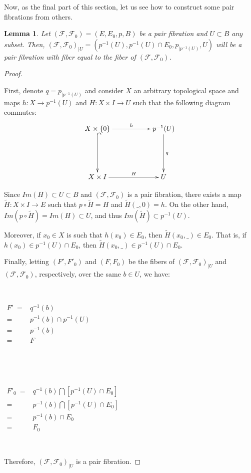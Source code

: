 \documentclass[12pt,oneside]{book}
\newtheorem{lem}    {Lemma}[chapter]
\newcommand{\wt}{\widetilde}
\begin{document}
    Now, as the final part of this section, let us see how to construct some pair fibrations from others.
    
    \begin{lem}\label{pf_restricao}
        Let $(\mathcal{F},\mathcal{F}_{0})=(E,E_{0},p,B)$ be a pair fibration and $U\subset B$ any subset. Then, 
        $(\mathcal{F},\mathcal{F}_{0})_{|U}=(p^{-1}(U),p^{-1}(U)\cap E_{0},p_{|p^{-1}(U)},U)$ will be a pair 
        fibration with fiber equal to the fiber of $(\mathcal{F},\mathcal{F}_{0})$.
    \end{lem}
    \begin{proof}
    
    \
    
    First, denote $q=p_{|p^{-1}(U)}$ and consider $X$ an arbitrary topological space and maps $h:X\to p^{-1}(U)$ and $H:X\times I\to U$ such 
    that the following diagram commutes:
    $$ \xymatrix @C=0.5cm {
        X\times\{ 0 \} \ar[rrr]^-{h} \ar@{^(->}[dd] &&& p^{-1}(U) \ar[dd]^-{q} \\
        &&& \\
        X\times I \ar[rrr]^-{H} &&& U 
    }$$
    
    Since $Im(H)\subset U\subset B$ and $(\mathcal{F},\mathcal{F}_{0})$ is a pair fibration, there exists a map $\wt{H}:X\times I\to E$ such 
    that $p\circ\wt{H}=H$ and $\wt{H}(\_,0)=h$. On the other hand, $Im(p\circ\wt{H})=Im(H)\subset U$, and thus $Im(\wt{H})\subset p^{-1}(U)$.
    
    Moreover, if $x_{0}\in X$ is such that $h(x_{0})\in E_{0}$, then $\wt{H}(x_{0},\_)\in E_{0}$. That is, if 
    $h(x_{0})\in p^{-1}(U)\cap E_{0}$, then $\wt{H}(x_{0},\_)\in p^{-1}(U)\cap E_{0}$.
    
    Finally, letting $(F',F'_{0})$ and $(F,F_{0})$ be the fibers of $(\mathcal{F},\mathcal{F}_{0})_{|U}$ and $(\mathcal{F},\mathcal{F}_{0})$, 
    respectively, over the same $b\in U$, we have:

    \
    
    $\begin{array}{rl}
        F' \ = & q^{-1}(b) \\
        = & p^{-1}(b)\cap p^{-1}(U) \\
        = & p^{-1}(b) \\
        = & F
    \end{array}$

    \

    \

    $\begin{array}{rl}
        F'_{0} \ = & q^{-1}(b)\bigcap [p^{-1}(U)\cap E_{0}] \\
        = & p^{-1}(b)\bigcap [p^{-1}(U)\cap E_{0}] \\
        = & p^{-1}(b)\cap E_{0} \\
        = & F_{0}
    \end{array}$

    \
    
    Therefore, $(\mathcal{F},\mathcal{F}_{0})_{|U}$ is a pair fibration.
    
    \end{proof}
\end{document}
